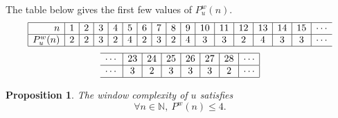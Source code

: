 \documentclass[a4 paper,12pt]{article}
\newtheorem{proposition}{Proposition}[section]
\begin{document}
The table below  gives the first few values of %
  $P^{w}_{u}(n).$\\  
 $$
\begin{array}{|r|c|c|c|c|c|c|c|c|c|c|c|c|c|c|c|c}
	\hline
	n	&1&2&3&4&5 &6&7&8&9&10&11&12&13&14&15&\cdots\\
	\hline
	P^{w}_{u}(n)&2&2&3&2&4 &2&3&2&4&3&3&2&4&3&3&\cdots\\
	\hline
\end{array}
$$
$$\begin{array}{r|c|c|c|c|c|c|c|}
	\hline
	\cdots &23&24&25&26&27&28&\cdots\\
	\hline
	\cdots&3&2&3&3&3&2&\cdots\\
	\hline
\end{array}
$$
%

\begin{proposition}
The window complexity of $u$ satisfies
$$\forall n\in \mathbb{N}, \ P^w(n)\leq 4.$$
\end{proposition}
\end{document}

